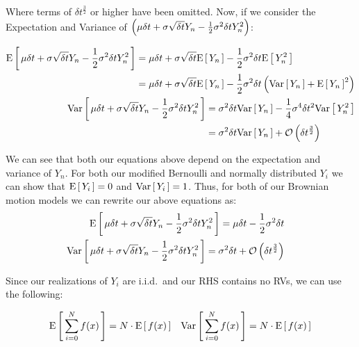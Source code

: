 Where terms of \(\delta t^\frac{3}{2}\) or higher have been omitted.
\nline{}
Now, if we consider the Expectation and Variance of \(\left(\mu\delta t + \sigma\sqrt{\delta t}Y_n - \frac{1}{2}\sigma^2\delta tY_n^2\right)\):

\begin{align*}
    \begin{split}
        \text{E}\left[\,\mu\delta t + \sigma\sqrt{\delta t}Y_n - \frac{1}{2}\sigma^2\delta tY_n^2\,\right] &=  \mu\delta t + \sigma\sqrt{\delta t}\text{E}\left[\,Y_n\,\right] - \frac{1}{2}\sigma^2\delta t\text{E}\left[\,Y_n^2\,\right] \\
        &= \mu\delta t + \sigma\sqrt{\delta t}\text{E}\left[\,Y_n\,\right] - \frac{1}{2}\sigma^2\delta t\left(\text{Var}\left[\,Y_n\,\right] + \text{E}\left[\,Y_n\,\right]^2\right)
    \end{split}
    \\
    \begin{split}
        \text{Var}\left[\,\mu\delta t + \sigma\sqrt{\delta t}Y_n - \frac{1}{2}\sigma^2\delta tY_n^2\,\right] &= \sigma^2\delta t\text{Var}\left[\,Y_n\,\right] - \frac{1}{4}\sigma^4\delta t^2\text{Var}\left[\,Y_n^2\,\right] \\
        &= \sigma^2\delta t\text{Var}\left[\,Y_n\,\right] + \mathcal{O}\left(\delta t^\frac{3}{2}\right)
    \end{split}
\end{align*}

We can see that both our equations above depend on the expectation and variance of \(Y_n\). For both our modified Bernoulli and normally distributed \(Y_i\) we can show that \(\text{E}\left[\,Y_i\,\right] = 0\) and \(\text{Var}\left[\,Y_i\,\right] = 1\). Thus, for both of our Brownian motion models we can rewrite our above equations as:
\begin{align*}
    \begin{split}
        \text{E}\left[\,\mu\delta t + \sigma\sqrt{\delta t}Y_n - \frac{1}{2}\sigma^2\delta tY_n^2\,\right] &= \mu\delta t - \frac{1}{2}\sigma^2\delta t
    \end{split}
    \\
    \begin{split}
        \text{Var}\left[\,\mu\delta t + \sigma\sqrt{\delta t}Y_n - \frac{1}{2}\sigma^2\delta tY_n^2\,\right] &= \sigma^2\delta t + \mathcal{O}\left(\delta t^\frac{3}{2}\right)
    \end{split}
\end{align*}

Since our realizations of \(Y_i\) are i.i.d.~and our RHS contains no RVs, we can use the following:

\begin{align*}
    \text{E}\left[\,\sum_{i=0}^N f(x)\,\right] = N\cdot\text{E}\left[\,f(x)\,\right] && \text{Var}\left[\,\sum_{i=0}^N f(x)\,\right] = N\cdot\text{E}\left[\,f(x)\,\right]
\end{align*}

